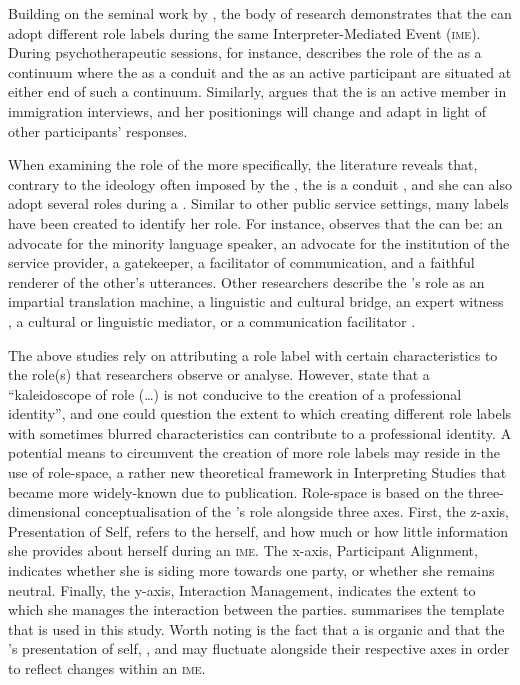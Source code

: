 \documentclass[output=paper]{langsci/langscibook}
\begin{document}
Building on the seminal work by \citet{Wadensjö1998}, the body of research demonstrates that the  can adopt different role labels during the same Inter\-preter-Mediated Event (\textsc{ime}). During psychotherapeutic sessions, \citet{Bot2009} for instance, describes the role of the  as a continuum where the  as a conduit and the  as an active participant are situated at either end of such a continuum. Similarly, \citet{Mason2009} argues that the  is an active member in immigration interviews, and her positionings will change and adapt in light of other participants’ responses. 

When examining the role of the  more specifically, the literature reveals that, contrary to the ideology often imposed by the , the  is a conduit \citep{Laster1994}, and she can also adopt several roles during a  \citep{Berk-Seligson1990,Martin2009}. Similar to other public service settings, many labels have been created to identify her role. For instance, \citet{Hale2008} observes that the  can be: an advocate for the minority language speaker, an advocate for the institution of the service provider, a gatekeeper, a facilitator of communication, and a faithful renderer of the other’s utterances. Other researchers describe the ’s role as an impartial translation machine, a linguistic and cultural bridge, an expert witness \citep{Mikkelson1998}, a cultural or linguistic mediator, or a communication facilitator \citep{Nartowska2016}.

The above studies rely on attributing a role label with certain characteristics to the role(s) that researchers observe or analyse. However, \citet[32]{Gentile1996} state that a “kaleidoscope of role (…) is not conducive to the creation of a professional identity”, and one could question the extent to which creating different role labels with sometimes blurred characteristics can contribute to a professional identity. A potential means to circumvent the creation of more role labels may reside in the use of role-space, a rather new theoretical framework in Interpreting Studies that became more widely-known due to  publication. Role-space is based on the three-dimensional conceptualisation of the ’s role alongside three axes. First, the z-axis, Presentation of Self, refers to the  herself, and how much or how little information she provides about herself during an \textsc{ime}. The x-axis, Participant Alignment, indicates whether she is siding more towards one party, or whether she remains neutral. Finally, the y-axis, Interaction Management, indicates the extent to which she manages the interaction between the parties.  summarises the template that is used in this study. Worth noting is the fact that a  is organic and that the ’s presentation of self, , and  may fluctuate alongside their respective axes in order to reflect changes within an \textsc{ime}.
\end{document}

